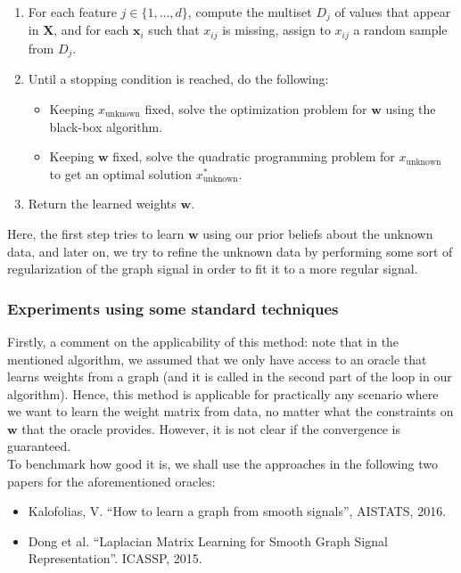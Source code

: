 \documentclass[a4paper]{article}
\newcommand{\nl}{\vspace{0.2cm}\\}
\newcommand{\mf}{\mathbf}
\begin{document}
\begin{enumerate}
    \item For each feature $j \in \{1, \ldots, d\}$, compute the multiset $D_j$ of values that appear in $\mf{X}$, and for each $\mf{x}_i$ such that $x_{ij}$ is missing, assign
        to $x_{ij}$ a random sample from $D_j$.
    \item Until a stopping condition is reached, do the following:
        \begin{itemize}
            \item Keeping $x_{\text{unknown}}$ fixed, solve the optimization problem for $\mf{w}$ using the black-box algorithm.
            \item Keeping $\mf{w}$ fixed, solve the quadratic programming problem for $x_{\text{unknown}}$ to get an optimal solution $x^*_{\text{unknown}}$.
        \end{itemize}
    \item Return the learned weights $\mf{w}$.
\end{enumerate}

Here, the first step tries to learn $\mf{w}$ using our prior beliefs about the unknown data, and later on, we try to refine the unknown data by performing some sort of regularization of the
graph signal in order to fit it to a more regular signal.

\subsubsection{Experiments using some standard techniques}
Firstly, a comment on the applicability of this method: note that in the mentioned algorithm, we assumed that we only have access to an oracle that learns weights from a graph (and it is called in
the second part of the loop in our algorithm). Hence, this method is applicable for practically any scenario where we want to learn the weight matrix from data, no matter what the constraints
on $\mf{w}$ that the oracle provides. However, it is not clear if the convergence is guaranteed.\nl
To benchmark how good it is, we shall use the approaches in the following two papers for the aforementioned oracles:

\begin{itemize}
    \item Kalofolias, V. ``How to learn a graph from smooth signals'', AISTATS, 2016.
    \item Dong et al. ``Laplacian Matrix Learning for Smooth Graph Signal Representation''. ICASSP, 2015.
\end{itemize}
\end{document}

